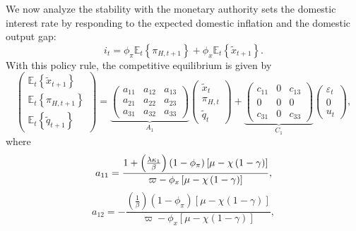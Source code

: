 \documentclass{article}
\begin{document}
We now analyze the stability with the monetary authority sets the domestic
interest rate by responding to the expected domestic inflation and the
domestic output gap:%
\begin{equation}
i_{t}=\phi _{\pi }\mathbb{E}_{t}\left\{ \pi _{H,t+1}\right\} +\phi _{x}%
\mathbb{E}_{t}\left\{ \widetilde{x}_{t+1}\right\} .  \label{EDITR}
\end{equation}%
With this policy rule, the competitive equilibrium is given by%
\begin{equation}
\left( 
\begin{array}{c}
\mathbb{E}_{t}\left\{ \widetilde{x}_{t+1}\right\} \\ 
\mathbb{E}_{t}\left\{ \pi _{H,t+1}\right\} \\ 
\mathbb{E}_{t}\left\{ \widetilde{q}_{t+1}\right\}%
\end{array}%
\right) =\underset{A_{1}}{\underbrace{\left( 
\begin{array}{ccc}
a_{11} & a_{12} & a_{13} \\ 
a_{21} & a_{22} & a_{23} \\ 
a_{31} & a_{32} & a_{33}%
\end{array}%
\right) }}\left( 
\begin{array}{c}
\widetilde{x}_{t} \\ 
\pi _{H,t} \\ 
\widetilde{q}_{t}%
\end{array}%
\right) +\underset{C_{1}}{\underbrace{\left( 
\begin{array}{ccc}
c_{11} & 0 & c_{13} \\ 
0 & 0 & 0 \\ 
c_{31} & 0 & c_{33}%
\end{array}%
\right) }}\left( 
\begin{array}{c}
\varepsilon _{t} \\ 
0 \\ 
u_{t}%
\end{array}%
\right) ,  \label{EDITR solution}
\end{equation}%
where 
\begin{equation*}
a_{11}=\frac{1+\left( \frac{\lambda \kappa _{1}}{\beta }\right) \left(
1-\phi _{\pi }\right) \left[ \mu -\chi \left( 1-\gamma \right) \right] }{%
\varpi -\phi _{x}\left[ \mu -\chi \left( 1-\gamma \right) \right] },
\end{equation*}%
\begin{equation*}
a_{12}=-\frac{\left( \frac{1}{\beta }\right) \left( 1-\phi _{\pi }\right) %
\left[ \mu -\chi \left( 1-\gamma \right) \right] }{\varpi -\phi _{x}\left[
\mu -\chi \left( 1-\gamma \right) \right] },
\end{equation*}%
\end{document}

